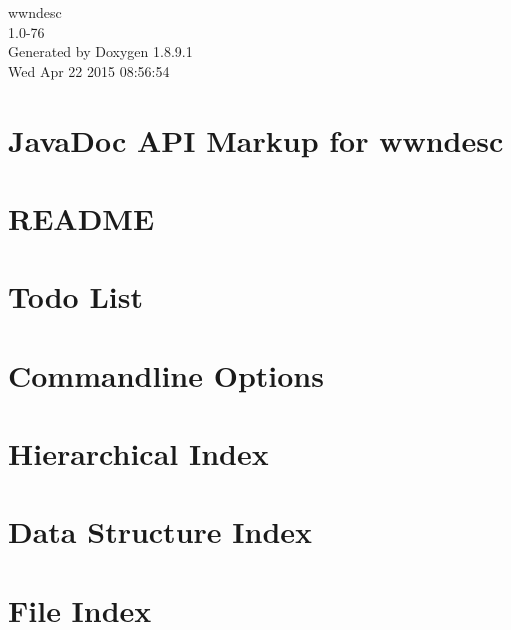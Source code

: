\documentclass[twoside]{book}
\newcommand{\+}{\discretionary{\mbox{\scriptsize$\hookleftarrow$}}{}{}}
\newcommand{\clearemptydoublepage}{%
  \newpage{\pagestyle{empty}\cleardoublepage}%
}
\begin{document}
\begin{titlepage}
\vspace*{7cm}
\begin{center}%
{\Large wwndesc \\[1ex]\large 1.\+0-\/76 }\\
\vspace*{1cm}
{\large Generated by Doxygen 1.8.9.1}\\
\vspace*{0.5cm}
{\small Wed Apr 22 2015 08:56:54}\\
\end{center}
\end{titlepage}
\clearemptydoublepage
\tableofcontents
\clearemptydoublepage
{}

\chapter{Java\+Doc A\+P\+I Markup for wwndesc}
\label{index}
\chapter{R\+E\+A\+D\+M\+E}
\label{md_htdocs_README}

\chapter{Todo List}
\label{todo}

\chapter{Commandline Options}
\label{cmdopt}

\chapter{Hierarchical Index}

\chapter{Data Structure Index}

\chapter{File Index}

\end{document}
